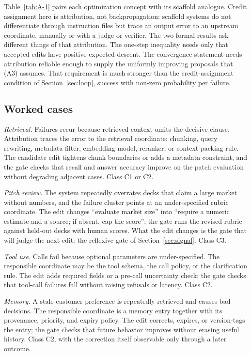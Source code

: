 \documentclass[
  11pt,
]{article}
\begin{document}
Table~\ref{tab:A-1} pairs each optimization concept with its scaffold analogue. Credit assignment here is attribution, not backpropagation: scaffold systems do not differentiate through instruction files but trace an output error to an upstream coordinate, manually or with a judge or verifier. The two formal results ask different things of that attribution. The one-step inequality needs only that accepted edits have positive expected descent. The convergence statement needs attribution reliable enough to supply the uniformly improving proposals that (A3) assumes. That requirement is much stronger than the credit-assignment condition of Section~\ref{sec:loop}, success with non-zero probability per failure.

\subsection{Worked cases}\label{worked-cases}

\emph{Retrieval.} Failures recur because retrieved context omits the decisive clause. Attribution traces the error to the retrieval coordinate: chunking, query rewriting, metadata filter, embedding model, reranker, or context-packing rule. The candidate edit tightens chunk boundaries or adds a metadata constraint, and the gate checks that recall and answer accuracy improve on the patch evaluation without degrading adjacent cases. Class C1 or C2.

\emph{Pitch review.} The system repeatedly overrates decks that claim a large market without numbers, and the failure cluster points at an under-specified rubric coordinate. The edit changes ``evaluate market size'' into ``require a numeric estimate and a source; if absent, cap the score''; the gate runs the revised rubric against held-out decks with human scores. What the edit changes is the gate that will judge the next edit: the reflexive gate of Section~\ref{sec:signal}. Class C3.

\emph{Tool use.} Calls fail because optional parameters are under-specified. The responsible coordinate may be the tool schema, the call policy, or the clarification rule. The edit adds required fields or a pre-call uncertainty check; the gate checks that tool-call failures fall without raising refusals or latency. Class C2.

\emph{Memory.} A stale customer preference is repeatedly retrieved and causes bad decisions. The responsible coordinate is a memory entry together with its provenance, priority, and expiry policy. The edit corrects, expires, or version-tags the entry; the gate checks that future behavior improves without erasing useful history. Class C2, with the correction itself observable only through a later outcome.
\end{document}
